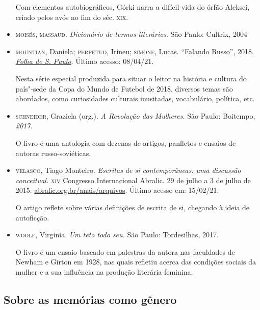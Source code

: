 \documentclass[11pt]{extarticle}
\begin{document}
\begin{itemize}
Com elementos autobiográficos, Górki narra a difícil vida do órfão Aleksei, criado pelos avós no fim do séc. \textsc{xix}. 

\item\textsc{moisés, massaud}. \emph{Dicionário de termos literários}. São Paulo:
Cultrix, 2004

\item\textsc{mountian}, Daniela; \textsc{perpetuo}, Irineu; \textsc{simone}, 
Lucas. ``Falando Russo'', 2018. \href{https://www1.folha.uol.com.br/especial/2018/falando-russo//\#20}{\emph{Folha de S. Paulo}}. Último acesso: 08/04/21.

Nesta série especial produzida para situar o leitor na história e
cultura do país"-sede da Copa do Mundo de Futebol de 2018, diversos temas
são abordados, como curiosidades culturais inusitadas, vocabulário,
política, etc.

\item\textsc{schneider}, Graziela (org.). \emph{A Revolução das Mulheres.} São Paulo:
Boitempo, \emph{2017.}

O livro é uma antologia com dezenas de artigos, panfletos e
ensaios de autoras russo-soviéticas.

\item\textsc{velasco}, Tiago Monteiro. \emph{Escritas de si contemporâneas: uma
discussão conceitual.} \textsc{xiv} Congresso Internacional Abralic. 29 de julho
a 3 de julho de 2015. \href{https://abralic.org.br/anais/arquivos/2015_1456108793.pdf}{abralic.org.br/anais/arquivos}.
Último acesso em: 15/02/21.

O artigo reflete sobre várias definições de escrita de si, chegando à ideia de autoficção.

\item\textsc{woolf}, Virginia. \emph{Um teto todo seu.} São Paulo: Tordesilhas, 2017.

O livro é um ensaio baseado em palestras da autora nas faculdades
de Newham e Girton em 1928, nas quais refletiu acerca
das condições sociais da mulher e a sua influência na produção
literária feminina. 
\end{itemize}

\subsection{Sobre as memórias como gênero}
\end{document}
